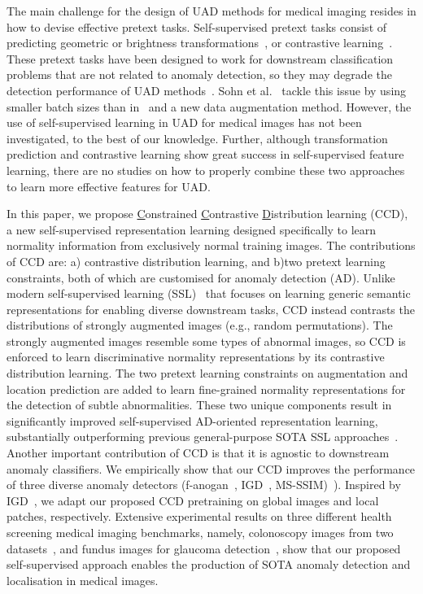 \documentclass[runningheads]{llncs}
\begin{document}
The main challenge for the design of UAD methods for medical imaging resides in how to devise effective pretext tasks.
Self-supervised pretext tasks consist of predicting geometric or brightness transformations~\cite{hendrycks2019using,golan2018deep,bergman2020classification}, or contrastive learning~\cite{simclr,moco}.
These pretext tasks have been designed to work for downstream classification problems that are not related to anomaly detection, so
they may degrade the detection performance of UAD methods~\cite{wang2020understanding}.
Sohn et al.~\cite{sohn2020learning} tackle this issue
by using smaller batch sizes than in~\cite{simclr,moco} and a new data augmentation method. 
However, the use of self-supervised learning in UAD for medical images has not been investigated, to the best of our knowledge. Further, although transformation prediction and contrastive learning show great success in self-supervised feature learning, there are no studies on how to properly combine these two approaches to learn more effective features for UAD. 


In this paper, we propose \underline{C}onstrained \underline{C}ontrastive \underline{D}istribution learning (CCD), a new self-supervised representation learning designed specifically to learn normality information from exclusively normal training images. The contributions of CCD are: a) contrastive distribution learning, and b)two pretext learning constraints, both of which are customised for anomaly detection (AD). Unlike modern self-supervised learning (SSL)~\cite{simclr,moco} that focuses on learning generic semantic representations for enabling diverse downstream tasks, CCD instead contrasts the distributions of strongly augmented images (e.g., random permutations). The strongly augmented images resemble some types of abnormal images, so CCD is enforced to learn discriminative normality representations by its contrastive distribution learning. The two pretext learning constraints on augmentation and location prediction are added to learn fine-grained normality representations for the detection of subtle abnormalities. These two unique components result in significantly improved self-supervised AD-oriented representation learning, substantially outperforming previous general-purpose SOTA SSL approaches~\cite{simclr,hendrycks2019using,golan2018deep,bergman2020classification}. Another important contribution of CCD is that it is agnostic to downstream anomaly classifiers. We empirically show that our CCD improves the performance of three diverse anomaly detectors (f-anogan~\cite{F-anoGAN}, IGD~\cite{chen2021unsupervised}, MS-SSIM)~\cite{wang2003multiscale}). Inspired by IGD~\cite{chen2021unsupervised}, we adapt our proposed CCD pretraining on global images and local patches, respectively.  Extensive experimental results on three different health screening medical imaging benchmarks, namely, colonoscopy images from two datasets~\cite{borgli2020hyperkvasir,liu2019photoshopping}, and fundus images for glaucoma detection~\cite{li2019attention}, show that our proposed self-supervised approach enables the production of SOTA anomaly detection and localisation in medical images.
\end{document}

